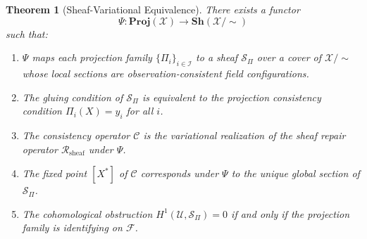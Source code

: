 \documentclass[11pt, oneside]{article}
\newtheorem{theorem}{Theorem}[section]
\newcommand{\Xmod}{\mathcal{X}/{\sim}}
\begin{document}
\begin{theorem}[Sheaf-Variational Equivalence]
\label{thm:equivalence}
There exists a functor
\[
\Psi : \mathbf{Proj}(\mathcal{X}) \longrightarrow \mathbf{Sh}(\Xmod)
\]
such that:
\begin{enumerate}
\item[(i)] $\Psi$ maps each projection family $\{\Pi_i\}_{i \in \mathcal{I}}$ to a sheaf
$\mathcal{S}_\Pi$ over a cover of $\Xmod$ whose local sections are observation-consistent
field configurations.
\item[(ii)] The gluing condition of $\mathcal{S}_\Pi$ is equivalent to the projection
consistency condition $\Pi_i(X) = y_i$ for all $i$.
\item[(iii)] The consistency operator $\mathcal{C}$ is the variational realization of the
sheaf repair operator $\mathcal{R}_{\mathrm{sheaf}}$ under $\Psi$.
\item[(iv)] The fixed point $[X^*]$ of $\mathcal{C}$ corresponds under $\Psi$ to the
unique global section of $\mathcal{S}_\Pi$.
\item[(v)] The cohomological obstruction $H^1(\mathcal{U}, \mathcal{S}_\Pi) = 0$ if and
only if the projection family is identifying on $\mathcal{F}$.
\end{enumerate}
\end{theorem}
\end{document}
